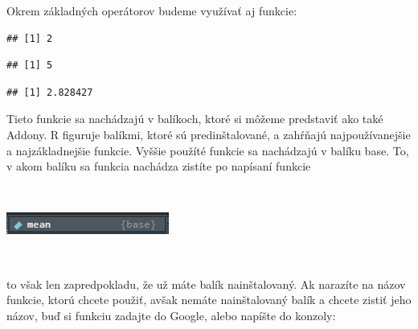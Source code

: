 Okrem základných operátorov budeme využívať aj funkcie:

\begin{Shaded}
\begin{Highlighting}[]
\NormalTok{(}\NormalTok{, }\NormalTok{, }\NormalTok{)}
\end{Highlighting}
\end{Shaded}

\begin{verbatim}
## [1] 2
\end{verbatim}

\begin{Shaded}
\begin{Highlighting}[]
\NormalTok{(}\OperatorTok{-}\NormalTok{)}
\end{Highlighting}
\end{Shaded}

\begin{verbatim}
## [1] 5
\end{verbatim}

\begin{Shaded}
\begin{Highlighting}[]
\NormalTok{(}\NormalTok{)}
\end{Highlighting}
\end{Shaded}

\begin{verbatim}
## [1] 2.828427
\end{verbatim}

Tieto funkcie sa nachádzajú v balíkoch, ktoré si môžeme predstaviť ako
také Addony. R figuruje balíkmi, ktoré sú predinštalované, a zahŕňajú
najpoužívanejšie a najzákladnejšie funkcie. Vyššie použíté funkcie sa
nachádzajú v balíku base. To, v akom balíku sa funkcia nachádza zistíte
po napísaní funkcie

~

\begin{center}

\includegraphics{diplomka obrazky/1.png}

\end{center}

~

to však len zapredpokladu, že už máte balík nainštalovaný. Ak narazíte
na názov funkcie, ktorú chcete použiť, avšak nemáte nainštalovaný balík
a chcete zistiť jeho názov, buď si funkciu zadajte do Google, alebo
napíšte do konzoly:

